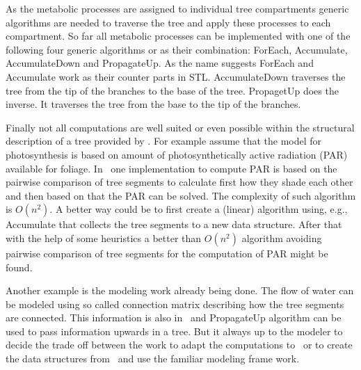 As   the  metabolic   processes  are   assigned  to   individual  tree
compartments generic  algorithms are needed  to traverse the  tree and
apply  these processes  to  each compartment.   So  far all  metabolic
processes can  be implemented with  one of the following  four generic
algorithms   or    as   their   combination:    ForEach,   Accumulate,
AccumulateDown  and PropagateUp.   As  the name  suggests ForEach  and
Accumulate  work  as  their  counter  parts  in  STL.   AccumulateDown
traverses the  tree from the  tip of the  branches to the base  of the
tree. PropagetUp does the inverse. It traverses the tree from the base
to the tip of the branches.

Finally not all  computations are well suited or  even possible within
the structural description of a  tree provided by \lignum. For example
assume  that  the model  for  photosynthesis  is  based on  amount  of
photosynthetically active  radiation (PAR) available  for foliage.  In
\lignum\ one  implementation to compute  PAR is based on  the pairwise
comparison of  tree segments  to calculate first  how they  shade each
other and then based on that the PAR can be solved.  The complexity of
such algorithm is  $O(n^2)$.  A better way could be  to first create a
(linear)  algorithm using,  e.g.,  Accumulate that  collects the  tree
segments to  a new data structure.   After that with the  help of some
heuristics  a   better  than  $O(n^2)$   algorithm  avoiding  pairwise
comparison of tree segments for the computation of PAR might be found.

Another example is the modeling  work already being done.  The flow of
water can be modeled using  so called connection matrix describing how
the tree segments are connected.  This information is also in \lignum\
and PropagateUp algorithm can be used to pass information upwards in a
tree. But it always up to  the modeler to decide the trade off between
the work to  adapt the computations to \lignum\ or  to create the data
structures  from \lignum\ and  use the familiar  modeling frame
work.


